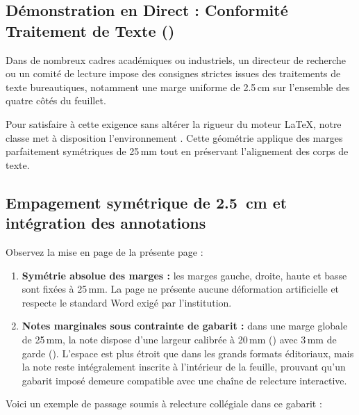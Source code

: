 \begin{WordGeometry}

\section{Démonstration en Direct : Conformité Traitement de Texte ()}
\label{sec:demo-geometrie-word}

Dans de nombreux cadres académiques ou industriels, un directeur de recherche ou un comité de lecture
impose des consignes strictes issues des traitements de texte bureautiques,
notamment une marge uniforme de 2.5\,cm sur l'ensemble des quatre côtés du feuillet.

Pour satisfaire à cette exigence sans altérer la rigueur du moteur \LaTeX{},
notre classe met à disposition l'environnement .
Cette géométrie applique des marges parfaitement symétriques de 25\,mm tout en préservant
l'alignement des corps de texte.

\subsection{Empagement symétrique de 2.5~cm et intégration des annotations}
Observez la mise en page de la présente page :
\begin{enumerate}
  \item \textbf{Symétrie absolue des marges :}
  les marges gauche, droite, haute et basse sont fixées à 25\,mm.
  La page ne présente aucune déformation artificielle et respecte le standard Word exigé par l'institution.
  \item \textbf{Notes marginales sous contrainte de gabarit :}
  dans une marge globale de 25\,mm, la note dispose d'une largeur calibrée à 20\,mm ()
  avec 3\,mm de garde ().
  L'espace est plus étroit que dans les grands formats éditoriaux,
  mais la note reste intégralement inscrite à l'intérieur de la feuille,
  prouvant qu'un gabarit imposé demeure compatible avec une chaîne de relecture interactive.
\end{enumerate}

Voici un exemple de passage soumis à relecture collégiale dans ce gabarit :


\end{WordGeometry}

